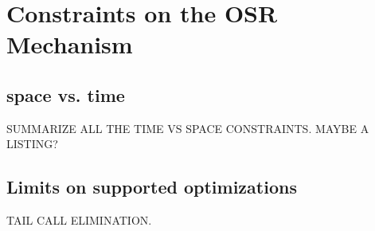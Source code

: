 \section{Constraints on the OSR Mechanism}
\subsection{space vs. time}
SUMMARIZE ALL THE TIME VS SPACE CONSTRAINTS. 
MAYBE A LISTING?
\subsection{Limits on supported optimizations}
TAIL CALL ELIMINATION.


